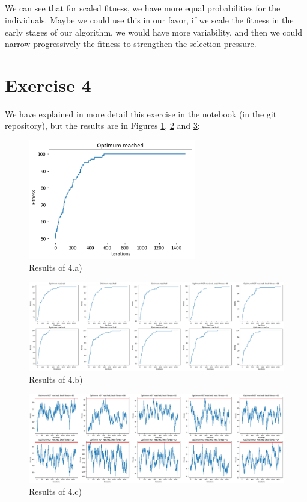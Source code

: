 \documentclass{scrartcl}
\begin{document}
\subsection{}
We can see that for scaled fitness, we have more equal probabilities for the individuals. Maybe we could use this in our favor, if we scale the fitness in the early stages of our algorithm, we would have more variability, and then we could narrow progressively the fitness to strengthen the selection pressure.


\section{Exercise 4}
We have explained in more detail this exercise in the notebook (in the git
repository), but the results are in Figures \ref{a}, \ref{b} and \ref{c}:

\begin{figure}[h]
    \centering
    \includegraphics[width=0.65\textwidth]{4/output_a.png}
    \caption{Results of 4.a)}
    \label{a}
\end{figure}
\begin{figure}[h]
    \centering
    \includegraphics[width=\textwidth]{4/output_b.png}
    \caption{Results of 4.b)}
    \label{b}
\end{figure}
\begin{figure}[h]
    \centering
    \includegraphics[width=\textwidth]{4/output_c.png}
    \caption{Results of 4.c)}
    \label{c}

\end{figure}
\end{document}
